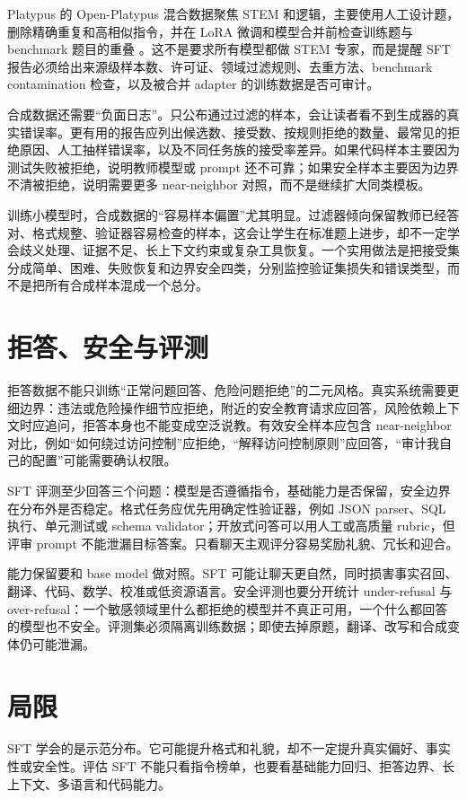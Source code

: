 \documentclass[UTF8,zihao=-4,openany]{ctexbook}
\begin{document}
Platypus 的 Open-Platypus 混合数据聚焦 STEM 和逻辑，主要使用人工设计题，删除精确重复和高相似指令，并在 LoRA 微调和模型合并前检查训练题与 benchmark 题目的重叠 \cite{lee2023platypus}。这不是要求所有模型都做 STEM 专家，而是提醒 SFT 报告必须给出来源级样本数、许可证、领域过滤规则、去重方法、benchmark contamination 检查，以及被合并 adapter 的训练数据是否可审计。

合成数据还需要“负面日志”。只公布通过过滤的样本，会让读者看不到生成器的真实错误率。更有用的报告应列出候选数、接受数、按规则拒绝的数量、最常见的拒绝原因、人工抽样错误率，以及不同任务族的接受率差异。如果代码样本主要因为测试失败被拒绝，说明教师模型或 prompt 还不可靠；如果安全样本主要因为边界不清被拒绝，说明需要更多 near-neighbor 对照，而不是继续扩大同类模板。

训练小模型时，合成数据的“容易样本偏置”尤其明显。过滤器倾向保留教师已经答对、格式规整、验证器容易检查的样本，这会让学生在标准题上进步，却不一定学会歧义处理、证据不足、长上下文约束或复杂工具恢复。一个实用做法是把接受集分成简单、困难、失败恢复和边界安全四类，分别监控验证集损失和错误类型，而不是把所有合成样本混成一个总分。

\section{拒答、安全与评测}
拒答数据不能只训练“正常问题回答、危险问题拒绝”的二元风格。真实系统需要更细边界：违法或危险操作细节应拒绝，附近的安全教育请求应回答，风险依赖上下文时应追问，拒答本身也不能变成空泛说教。有效安全样本应包含 near-neighbor 对比，例如“如何绕过访问控制”应拒绝，“解释访问控制原则”应回答，“审计我自己的配置”可能需要确认权限。

SFT 评测至少回答三个问题：模型是否遵循指令，基础能力是否保留，安全边界在分布外是否稳定。格式任务应优先用确定性验证器，例如 JSON parser、SQL 执行、单元测试或 schema validator；开放式问答可以用人工或高质量 rubric，但评审 prompt 不能泄漏目标答案。只看聊天主观评分容易奖励礼貌、冗长和迎合。

能力保留要和 base model 做对照。SFT 可能让聊天更自然，同时损害事实召回、翻译、代码、数学、校准或低资源语言。安全评测也要分开统计 under-refusal 与 over-refusal：一个敏感领域里什么都拒绝的模型并不真正可用，一个什么都回答的模型也不安全。评测集必须隔离训练数据；即使去掉原题，翻译、改写和合成变体仍可能泄漏。

\section{局限}
SFT 学会的是示范分布。它可能提升格式和礼貌，却不一定提升真实偏好、事实性或安全性。评估 SFT 不能只看指令榜单，也要看基础能力回归、拒答边界、长上下文、多语言和代码能力。
\end{document}
